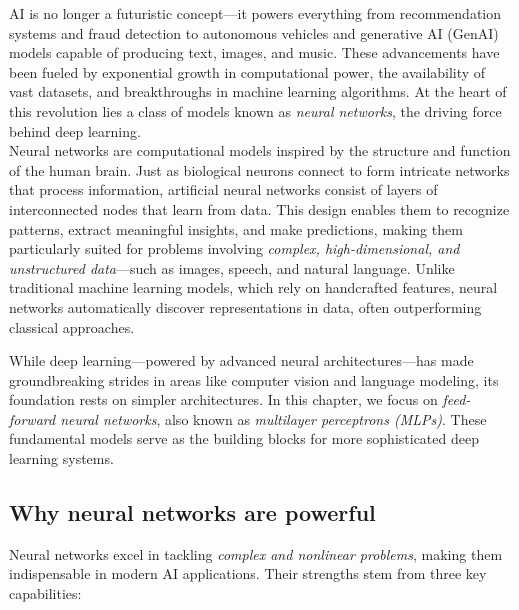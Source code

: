 \documentclass[
]{book}
\theoremstyle{definition}
\theoremstyle{definition}
\theoremstyle{definition}
\theoremstyle{definition}
\theoremstyle{remark}
\begin{document}
AI is no longer a futuristic concept---it powers everything from recommendation systems and fraud detection to autonomous vehicles and generative AI (GenAI) models capable of producing text, images, and music. These advancements have been fueled by exponential growth in computational power, the availability of vast datasets, and breakthroughs in machine learning algorithms. At the heart of this revolution lies a class of models known as \emph{neural networks}, the driving force behind deep learning.\\
Neural networks are computational models inspired by the structure and function of the human brain. Just as biological neurons connect to form intricate networks that process information, artificial neural networks consist of layers of interconnected nodes that learn from data. This design enables them to recognize patterns, extract meaningful insights, and make predictions, making them particularly suited for problems involving \emph{complex, high-dimensional, and unstructured data}---such as images, speech, and natural language. Unlike traditional machine learning models, which rely on handcrafted features, neural networks automatically discover representations in data, often outperforming classical approaches.

While deep learning---powered by advanced neural architectures---has made groundbreaking strides in areas like computer vision and language modeling, its foundation rests on simpler architectures. In this chapter, we focus on \emph{feed-forward neural networks}, also known as \emph{multilayer perceptrons (MLPs)}. These fundamental models serve as the building blocks for more sophisticated deep learning systems.

\subsection*{Why neural networks are powerful}\label{why-neural-networks-are-powerful}

Neural networks excel in tackling \emph{complex and nonlinear problems}, making them indispensable in modern AI applications. Their strengths stem from three key capabilities:
\end{document}
